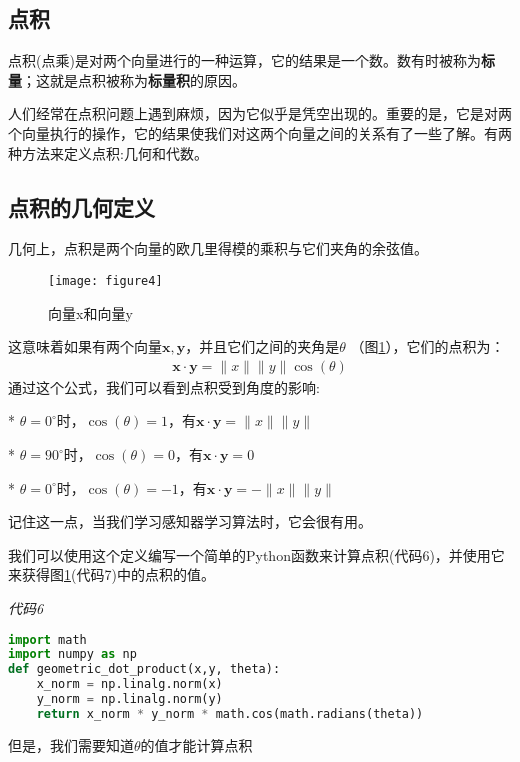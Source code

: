 \subsection{点积}

点积(点乘)是对两个向量进行的一种运算，它的结果是一个数。数有时被称为\textbf{标量}；这就是点积被称为\textbf{标量积}的原因。

人们经常在点积问题上遇到麻烦，因为它似乎是凭空出现的。重要的是，它是对两个向量执行的操作，它的结果使我们对这两个向量之间的关系有了一些了解。有两种方法来定义点积:几何和代数。

\subsection{点积的几何定义}
几何上，点积是两个向量的欧几里得模的乘积与它们夹角的余弦值。

\begin{figure}[ht]
    \centering
    \texttt{[image: figure4]}
    \caption{向量x和向量y}
    \label{figure4}
\end{figure}

这意味着如果有两个向量$\mathbf{x},\mathbf{y}$，并且它们之间的夹角是$\theta$ （图\ref{figure4}），它们的点积为：
\begin{gather*}
\mathbf{x} \cdot \mathbf{y} = \|x\| \|y\| \cos(\theta)
\end{gather*}
通过这个公式，我们可以看到点积受到角度的影响:

* $\theta=0^{\circ}$时，$\cos(\theta)=1$，有$\mathbf{x} \cdot \mathbf{y} = \|x\| \|y\|$

* $\theta=90^{\circ}$时，$\cos(\theta)=0$，有$\mathbf{x} \cdot \mathbf{y} = 0$

* $\theta=0^{\circ}$时，$\cos(\theta)=-1$，有$\mathbf{x} \cdot \mathbf{y} =- \|x\| \|y\|$

记住这一点，当我们学习感知器学习算法时，它会很有用。

我们可以使用这个定义编写一个简单的Python函数来计算点积(代码6)，并使用它来获得图\ref{figure4}(代码7)中的点积的值。

\emph{代码6}

\begin{lstlisting}[language=python]
import math 
import numpy as np 
def geometric_dot_product(x,y, theta): 
    x_norm = np.linalg.norm(x) 
    y_norm = np.linalg.norm(y) 
    return x_norm * y_norm * math.cos(math.radians(theta))
\end{lstlisting}

但是，我们需要知道$\theta$的值才能计算点积


